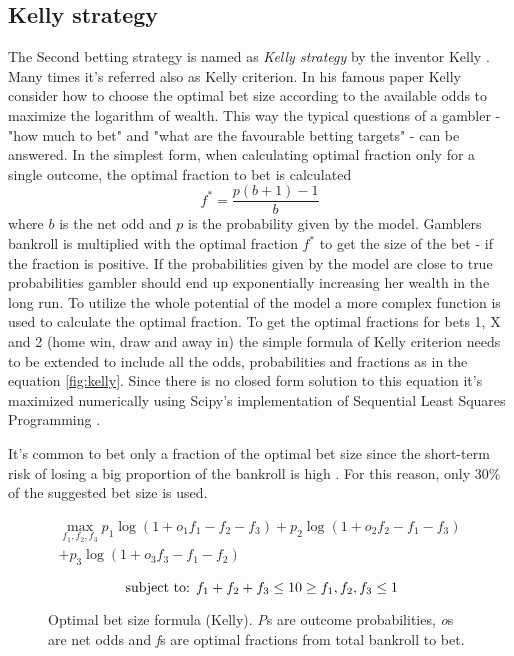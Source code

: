 \subsection{Kelly strategy}
The Second betting strategy is named as \textit{Kelly strategy} by the inventor Kelly \cite{kelly2011new}. Many times it's referred also as Kelly criterion. In his famous paper \cite{kelly2011new} Kelly consider how to choose the optimal bet size according to the available odds to maximize the logarithm of wealth. This way the typical questions of a gambler - "how much to bet" and "what are the favourable betting targets" -  can be answered. In the simplest form, when calculating optimal fraction only for a single outcome, the optimal fraction to bet is calculated
\begin{equation}
f ^ { * } =  \frac { p ( b + 1 ) - 1 } { b }
\end{equation}
where $b$ is the net odd and $p$ is the probability given by the model. Gamblers bankroll is multiplied with the optimal fraction $f^{*}$ to get the size of the bet - if the fraction is positive. If the probabilities given by the model are close to true probabilities gambler should end up exponentially increasing her wealth in the long run. To utilize the whole potential of the model a more complex function is used to calculate the optimal fraction. To get the optimal fractions for bets 1, X and 2 (home win, draw and away in) the simple formula of Kelly criterion needs to be extended to include all the odds, probabilities and fractions as in the equation \ref{fig:kelly}. Since there is no closed form solution to this equation it's maximized numerically using Scipy's implementation of Sequential Least Squares Programming \cite{scipy}.

It's common to bet only a fraction of the optimal bet size since the short-term risk of losing a big proportion of the bankroll is high \cite{maclean2011medium}. For this reason, only 30\% of the suggested bet size is used.
\begin{figure}
    \caption{Optimal bet size formula (Kelly). \textit{P}s are outcome probabilities, \textit{o}s are net odds and \textit{f}s are optimal fractions from total bankroll to bet.}
     \begin{equation}
        \begin{split}
            \max_{f_1, f_2, f_3} p_1  \log(1 + o_1 f_1 - f_2 - f_3) + p_2 \log(1 + o_2 f_2 - f_1 - f_3)  \\
            + p_3 \log(1 + o_3 f_3 - f_1 - f_2)
        \end{split}
     \end{equation}

    \begin{equation*}
        \text { subject to: }  f_1 + f_2 + f_3 \leq 1 \\
         0 \geq f_1, f_2, f_3 \leq 1
    \end{equation*}
    \label{eq:kelly}
\end{figure}

